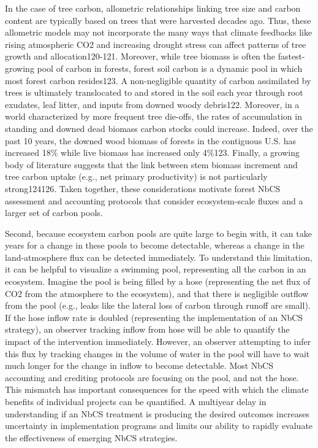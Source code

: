 \documentclass[
  letterpaper,
  DIV=11,
  numbers=noendperiod]{scrreprt}
\begin{document}
In the case of tree carbon, allometric relationships linking tree size
and carbon content are typically based on trees that were harvested
decades ago. Thus, these allometric models may not incorporate the many
ways that climate feedbacks like rising atmospheric CO2 and increasing
drought stress can affect patterns of tree growth and allocation120-121.
Moreover, while tree biomass is often the fastest-growing pool of carbon
in forests, forest soil carbon is a dynamic pool in which most forest
carbon resides123. A non-negligible quantity of carbon assimilated by
trees is ultimately translocated to and stored in the soil each year
through root exudates, leaf litter, and inputs from downed woody
debris122. Moreover, in a world characterized by more frequent tree
die-offs, the rates of accumulation in standing and downed dead biomass
carbon stocks could increase. Indeed, over the past 10 years, the downed
wood biomass of forests in the contiguous U.S. has increased 18\% while
live biomass has increased only 4\%123. Finally, a growing body of
literature suggests that the link between stem biomass increment and
tree carbon uptake (e.g., net primary productivity) is not particularly
strong124126. Taken together, these considerations motivate forest NbCS
assessment and accounting protocols that consider ecosystem-scale fluxes
and a larger set of carbon pools.

Second, because ecosystem carbon pools are quite large to begin with, it
can take years for a change in these pools to become detectable, whereas
a change in the land-atmosphere flux can be detected immediately. To
understand this limitation, it can be helpful to visualize a swimming
pool, representing all the carbon in an ecosystem. Imagine the pool is
being filled by a hose (representing the net flux of CO2 from the
atmosphere to the ecosystem), and that there is negligible outflow from
the pool (e.g., leaks like the lateral loss of carbon through runoff are
small). If the hose inflow rate is doubled (representing the
implementation of an NbCS strategy), an observer tracking inflow from
hose will be able to quantify the impact of the intervention
immediately. However, an observer attempting to infer this flux by
tracking changes in the volume of water in the pool will have to wait
much longer for the change in inflow to become detectable. Most NbCS
accounting and crediting protocols are focusing on the pool, and not the
hose. This mismatch has important consequences for the speed with which
the climate benefits of individual projects can be quantified. A
multiyear delay in understanding if an NbCS treatment is producing the
desired outcomes increases uncertainty in implementation programs and
limits our ability to rapidly evaluate the effectiveness of emerging
NbCS strategies.
\end{document}
